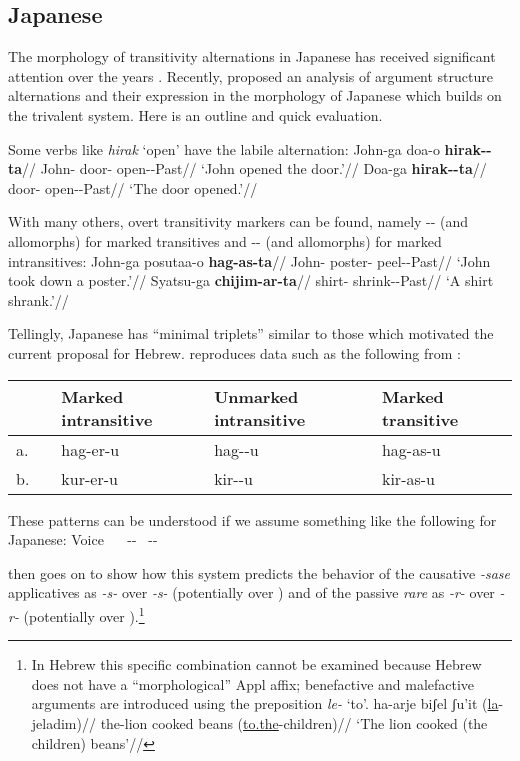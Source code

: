 	\subsection{Japanese} \label{i:i:jap}
The morphology of transitivity alternations in Japanese has received significant attention over the years \citep{suga80,jacobsen92,miyagawa98,nishiyama98,volpe05,harley08}. Recently, \cite{oseki17nyu} proposed an analysis of argument structure alternations and their expression in the morphology of Japanese which builds on the trivalent system. Here is an outline and quick evaluation.

Some verbs like \emph{hirak} `open' have the labile alternation:
\pex
	\a \begingl
		\gla John-ga doa-o \textbf{hirak-\zero-ta}//
		\glb John- door- open-\zero-Past//
		\glft `John opened the door.'//
	\endgl
	\a \begingl
		\gla Doa-ga \textbf{hirak-\zero-ta}//
		\glb door- open-\zero-Past//
		\glft `The door opened.'//
	\endgl
\xe

With many others, overt transitivity markers can be found, namely -- (and allomorphs) for marked transitives and -- (and allomorphs) for marked intransitives:
\pex
	\a \begingl
		\gla John-ga posutaa-o \textbf{hag-as-ta}//
		\glb John- poster- peel--Past//
		\glft `John took down a poster.'//
	\endgl
	\a \begingl
		\gla Syatsu-ga \textbf{chijim-ar-ta}//
		\glb shirt- shrink--Past//
		\glft `A shirt shrank.'//
	\endgl
\xe

Tellingly, Japanese has ``minimal triplets'' similar to those which motivated the current proposal for Hebrew. \cite{oseki17nyu} reproduces data such as the following from \cite{suga80}:
\ex
\begin{tabular}{lllll}
	& & Marked intransitive & Unmarked intransitive & Marked transitive\\\hline
	a.& \root{\gsc{PEEL}} & hag-er-u & hag-\zero-u & hag-as-u\\
	b.& \root{\gsc{CUT}} & kur-er-u & kir-\zero-u & kir-as-u\\
\end{tabular}
\xe

These patterns can be understood if we assume something like the following for Japanese:
\pex
	\a Voice \lra~\zero
	\a {\vz} \lra~--
	\a {\vd} \lra~--
\xe

\cite{oseki17nyu} then goes on to show how this system predicts the behavior of the causative \emph{-sase} applicatives as \emph{-s-} over \emph{-s-} (potentially {\vd} over {\vd}) and of the passive \emph{rare} as \emph{-r-} over \emph{-r-} (potentially {\vz} over {\vz}).\footnote{In Hebrew this specific combination cannot be examined because Hebrew does not have a ``morphological'' Appl affix; benefactive and malefactive arguments are introduced using the preposition \emph{le-} `to'. 
\ex \begingl
    \gla ha-arje biʃel ʃu'it (\underline{la}-jeladim)//
    \glb the-lion cooked beans (\underline{to.the}-children)//
    \glft `The lion cooked (the children) beans'//
    \endgl
\xe
}

